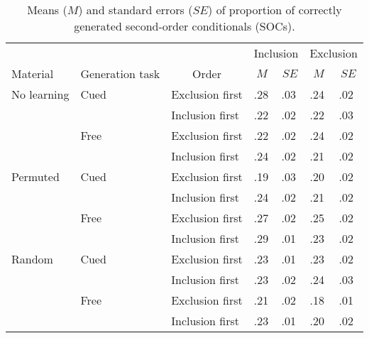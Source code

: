 \documentclass[
  english,
  man]{apa6}
\begin{document}
\begin{appendix}
\section{}



\begin{table}[h]

\begin{center}
\begin{threeparttable}

\caption{\label{tab:unnamed-chunk-2}Means (\(M\)) and standard errors (\(\mathit{SE}\))
of proportion of correctly generated second-order conditionals (SOCs).}

\begin{tabular}{lllllll}
\toprule
&  &  & \multicolumn{2}{c}{Inclusion} & \multicolumn{2}{c}{Exclusion} \\
\cmidrule(r){4-5} \cmidrule(r){6-7}
Material & \multicolumn{1}{c}{Generation task} & \multicolumn{1}{c}{Order} & \multicolumn{1}{c}{$M$} & \multicolumn{1}{c}{$\mathit{SE}$} & \multicolumn{1}{c}{$M$} & \multicolumn{1}{c}{$\mathit{SE}$}\\
\midrule
No learning & Cued & Exclusion first & .28 & .03 & .24 & .02\\
&  & Inclusion first & .22 & .02 & .22 & .03\\
& Free & Exclusion first & .22 & .02 & .24 & .02\\
&  & Inclusion first & .24 & .02 & .21 & .02\\ \midrule
Permuted & Cued & Exclusion first & .19 & .03 & .20 & .02\\
&  & Inclusion first & .24 & .02 & .21 & .02\\
& Free & Exclusion first & .27 & .02 & .25 & .02\\
&  & Inclusion first & .29 & .01 & .23 & .02\\ \midrule
Random & Cued & Exclusion first & .23 & .01 & .23 & .02\\
&  & Inclusion first & .23 & .02 & .24 & .03\\
& Free & Exclusion first & .21 & .02 & .18 & .01\\
&  & Inclusion first & .23 & .01 & .20 & .02\\ \midrule
\bottomrule
\end{tabular}

\end{threeparttable}
\end{center}

\end{table}
\end{appendix}
\end{document}
